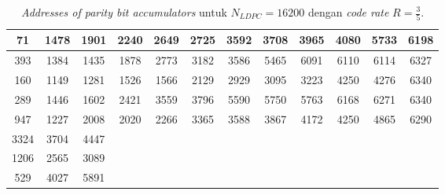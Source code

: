 \begin{table}[tb]
	\centering
	\caption{\textit{Addresses of parity bit accumulators} untuk $N_{LDPC}=16200$ dengan \textit{code rate} $R=\frac{3}{5}$.}
	\label{table:rate2}
	\begin{tabular}{|c|c|c|ccccccccc}
		\hline
		71   & 1478 & 1901 & \multicolumn{1}{c|}{2240} & \multicolumn{1}{c|}{2649} & \multicolumn{1}{c|}{2725} & \multicolumn{1}{c|}{3592} & \multicolumn{1}{c|}{3708} & \multicolumn{1}{c|}{3965} & \multicolumn{1}{c|}{4080} & \multicolumn{1}{c|}{5733} & \multicolumn{1}{c|}{6198} \\ \hline
		393  & 1384 & 1435 & \multicolumn{1}{c|}{1878} & \multicolumn{1}{c|}{2773} & \multicolumn{1}{c|}{3182} & \multicolumn{1}{c|}{3586} & \multicolumn{1}{c|}{5465} & \multicolumn{1}{c|}{6091} & \multicolumn{1}{c|}{6110} & \multicolumn{1}{c|}{6114} & \multicolumn{1}{c|}{6327} \\ \hline
		160  & 1149 & 1281 & \multicolumn{1}{c|}{1526} & \multicolumn{1}{c|}{1566} & \multicolumn{1}{c|}{2129} & \multicolumn{1}{c|}{2929} & \multicolumn{1}{c|}{3095} & \multicolumn{1}{c|}{3223} & \multicolumn{1}{c|}{4250} & \multicolumn{1}{c|}{4276} & \multicolumn{1}{c|}{6340} \\ \hline
		289  & 1446 & 1602 & \multicolumn{1}{c|}{2421} & \multicolumn{1}{c|}{3559} & \multicolumn{1}{c|}{3796} & \multicolumn{1}{c|}{5590} & \multicolumn{1}{c|}{5750} & \multicolumn{1}{c|}{5763} & \multicolumn{1}{c|}{6168} & \multicolumn{1}{c|}{6271} & \multicolumn{1}{c|}{6340} \\ \hline
		947  & 1227 & 2008 & \multicolumn{1}{c|}{2020} & \multicolumn{1}{c|}{2266} & \multicolumn{1}{c|}{3365} & \multicolumn{1}{c|}{3588} & \multicolumn{1}{c|}{3867} & \multicolumn{1}{c|}{4172} & \multicolumn{1}{c|}{4250} & \multicolumn{1}{c|}{4865} & \multicolumn{1}{c|}{6290} \\ \hline
		3324 & 3704 & 4447 &                           &                           &                           &                           &                           &                           &                           &                           &                           \\ \cline{1-3}
		1206 & 2565 & 3089 &                           &                           &                           &                           &                           &                           &                           &                           &                           \\ \cline{1-3}
		529  & 4027 & 5891 &                           &                           &                           &                           &                           &                           &                           &                           &                           \\ \cline{1-3}

\end{tabular}
\end{table}
